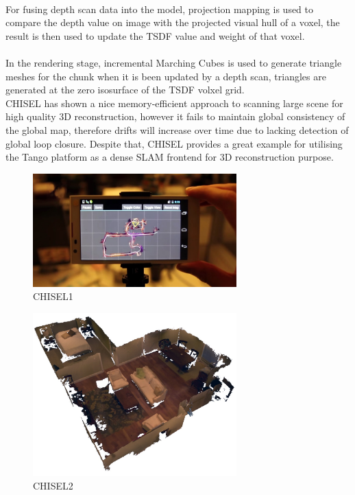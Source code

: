 \documentclass[12pt,twoside]{article}
\begin{document}
\\
For fusing depth scan data into the model, projection mapping is used to compare the depth value on image with the projected visual hull of a voxel, the result is then used to update the TSDF value and weight of that voxel.\\
\\
In the rendering stage, incremental Marching Cubes is used to generate triangle meshes for the chunk when it is been updated by a depth scan, triangles are generated at the zero isosurface of the TSDF volxel grid.\\
CHISEL has shown a nice memory-efficient approach to scanning large scene for high quality 3D reconstruction, however it fails to maintain global consistency of the global map, therefore drifts will increase over time due to lacking detection of global loop closure. Despite that, CHISEL provides a great example for utilising the Tango platform as a dense SLAM frontend for 3D reconstruction purpose.

\begin{figure}[h]
    \centering
    \includegraphics[width=0.7\textwidth]{figures/CHISEL1}
    \caption{CHISEL1}
    \label{fig:CHISEL1}
\end{figure}

\begin{figure}[h]
    \centering
    \includegraphics[width=0.7\textwidth]{figures/CHISEL2}
    \caption{CHISEL2}
    \label{fig: CHISEL2}
\end{figure}
\end{document}
